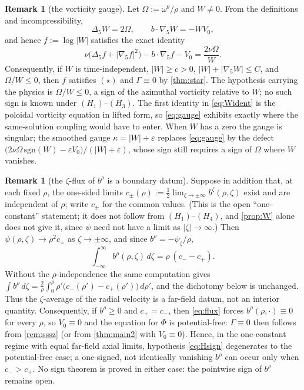 \documentclass[11pt]{article}
\theoremstyle{definition}
\newtheorem{remark}[theorem]{Remark}
\begin{document}
\begin{remark}[the vorticity gauge]\label{rem:gauge}
Let $\Omega:=\omega^\theta/\rho$ and $W\ne0$. From the definitions and
incompressibility,
\begin{equation}\label{eq:Wident}
\Delta_5W=2\Omega,\qquad b\cdot\nabla_5W=-WV_0,
\end{equation}
and hence $f:=\log|W|$ satisfies the exact identity
\begin{equation}\label{eq:gauge}
\nu\bigl(\Delta_5f+|\nabla_5f|^2\bigr)-b\cdot\nabla_5f-V_0=\frac{2\nu\Omega}{W}.
\end{equation}
Consequently, if $W$ is time-independent, $|W|\ge c>0$,
$|W|+|\nabla_5W|\le C$, and $\Omega/W\le0$, then $f$ satisfies $(\star)$
and $\Gamma\equiv0$ by \cref{thm:star}. The hypothesis carrying the physics is
$\Omega/W\le0$, a sign of the azimuthal vorticity relative to $W$; no such
sign is known under $(H_1)$--$(H_3)$. The first identity in \eqref{eq:Wident} is
the poloidal vorticity equation in lifted form, so \eqref{eq:gauge} exhibits
exactly where the same-solution coupling would have to enter. When $W$ has a
zero the gauge is singular; the smoothed gauge $\kappa=|W|+\varepsilon$
replaces \eqref{eq:gauge} by the defect
$\bigl(2\nu\Omega\,\mathrm{sgn}(W)-\varepsilon V_0\bigr)/(|W|+\varepsilon)$,
whose sign still requires a sign of $\Omega$ where $W$ vanishes.
\end{remark}

\begin{remark}[the $\zeta$-flux of $b^\rho$ is a boundary datum]
\label{rem:flux}
Suppose in addition that, at each fixed $\rho$, the one-sided limits
$c_\pm(\rho):=\tfrac12\lim_{\zeta\to\pm\infty}b^\zeta(\rho,\zeta)$ exist and
are independent of $\rho$; write $c_\pm$ for the common values. (This is the
open ``one-constant'' statement; it does not follow from $(H_1)$--$(H_4)$, and
\cref{prop:W} alone does not give it, since $\psi$ need not have a limit as
$|\zeta|\to\infty$.) Then $\psi(\rho,\zeta)\to\rho^2c_\pm$ as
$\zeta\to\pm\infty$, and since $b^\rho=-\psi_\zeta/\rho$,
\begin{equation}\label{eq:flux}
\int_{-\infty}^{\infty}b^\rho(\rho,\zeta)\,d\zeta=\rho\,(c_- - c_+).
\end{equation}
Without the $\rho$-independence the same computation gives
$\int b^\rho\,d\zeta=\frac{2}{\rho}\int_0^\rho\rho'\bigl(c_-(\rho')-c_+(\rho')\bigr)\,d\rho'$,
and the dichotomy below is unchanged.
Thus the $\zeta$-average of the radial velocity is a far-field datum, not an
interior quantity. Consequently, if $b^\rho\ge0$ and $c_+=c_-$, then
\eqref{eq:flux} forces $b^\rho(\rho,\cdot)\equiv0$ for every $\rho$, so
$V_0\equiv0$ and the equation for $\Phi$ is potential-free: $\Gamma\equiv0$
then follows from \cref{rem:sssz} (or from \cref{thm:main2} with
$V_0\equiv0$). Hence, in the one-constant regime with equal far-field axial
limits, hypothesis \eqref{eq:Hsign} degenerates to the potential-free case; a
one-signed, not identically vanishing $b^\rho$ can occur only when
$c_->c_+$. No sign theorem is proved in either case: the pointwise sign of
$b^\rho$ remains open.
\end{remark}
\end{document}

